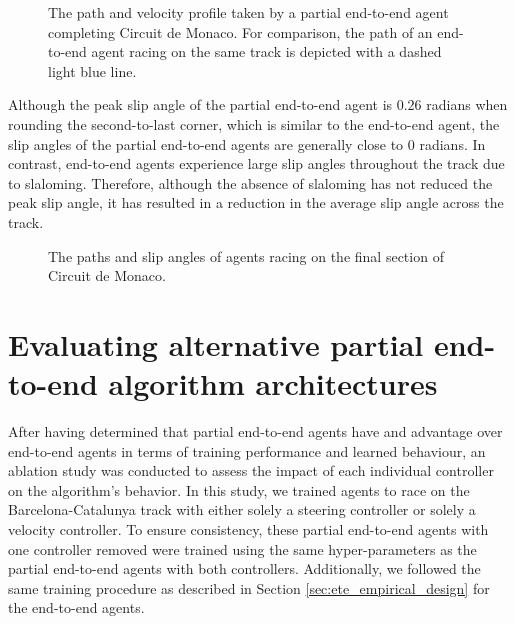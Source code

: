\begin{figure}[htb!]
    \centering
    
    \caption[The path and velocity profile taken by a partial end-to-end agent completing Circuit de Monaco]{The path and velocity profile taken by a partial end-to-end agent completing Circuit de Monaco. For comparison, the path of an end-to-end agent racing on the same track is depicted with a dashed light blue line.}
    \label{fig:mco_eval}
\end{figure}

Although the peak slip angle of the partial end-to-end agent is $0.26$ radians when rounding the second-to-last corner, which is similar to the end-to-end agent, the slip angles of the partial end-to-end agents are generally close to $0$ radians. 
In contrast, end-to-end agents experience large slip angles throughout the track due to slaloming.
Therefore, although the absence of slaloming has not reduced the peak slip angle, it has resulted in a reduction in the average slip angle across the track.

\begin{figure}[htb!]
    \centering
    
    \caption[Paths and slip angles of agents racing on Circuit de Monaco]{The paths and slip angles of agents racing on the final section of Circuit de Monaco.}
    \label{fig:pete:slip}
\end{figure}







\section{Evaluating alternative partial end-to-end algorithm architectures}

After having determined that partial end-to-end agents have and advantage over end-to-end agents in terms of training performance and learned behaviour, an ablation study was conducted to assess the impact of each individual controller on the algorithm's behavior. 
In this study, we trained agents to race on the Barcelona-Catalunya track with either solely a steering controller or solely a velocity controller.
To ensure consistency, these partial end-to-end agents with one controller removed were trained using the same hyper-parameters as the partial end-to-end agents with both controllers. 
Additionally, we followed the same training procedure as described in Section \ref{sec:ete_empirical_design} for the end-to-end agents.


